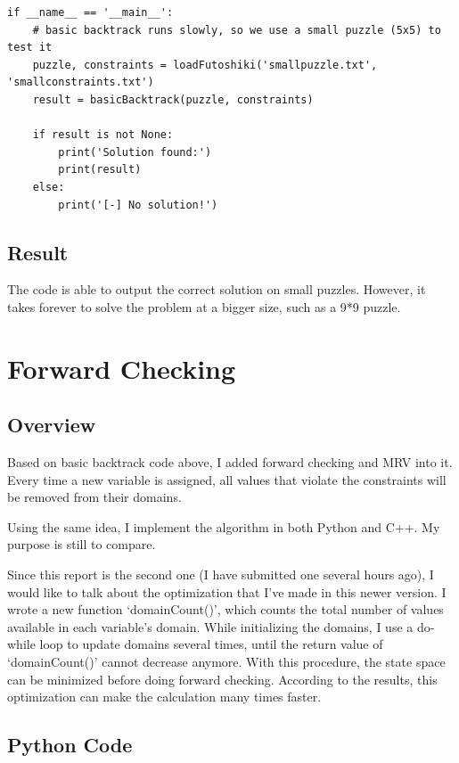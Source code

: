 \documentclass[a4paper, 11pt]{article}
\begin{document}
\begin{lstlisting}[title=basic_backtrack.py]
if __name__ == '__main__':
    # basic backtrack runs slowly, so we use a small puzzle (5x5) to test it
    puzzle, constraints = loadFutoshiki('smallpuzzle.txt', 'smallconstraints.txt')
    result = basicBacktrack(puzzle, constraints)

    if result is not None:
        print('Solution found:')
        print(result)
    else:
        print('[-] No solution!')
\end{lstlisting}

\subsection{Result}
The code is able to output the correct solution on small puzzles. However, it takes forever to solve the problem at a bigger size, such as a 9*9 puzzle.

\section{Forward Checking}
\subsection{Overview}
Based on basic backtrack code above, I added forward checking and MRV into it. Every time a new variable is assigned, all values that violate the constraints will be removed from their domains.


Using the same idea, I implement the algorithm in both Python and C++. My purpose is still to compare.

Since this report is the second one (I have submitted one several hours ago), I would like to talk about the optimization that I've made in this newer version. I wrote a new function `domainCount()', which counts the total number of values available in each variable's domain. While initializing the domains, I use a do-while loop to update domains several times, until the return value of `domainCount()' cannot decrease anymore. With this procedure, the state space can be minimized before doing forward checking. According to the results, this optimization can make the calculation many times faster.

\subsection{Python Code}
\end{document}
